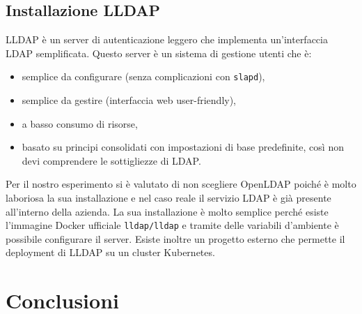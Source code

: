 \documentclass[12pt]{report}
\begin{document}
\section{Installazione LLDAP}
LLDAP è un server di autenticazione leggero che implementa un'interfaccia LDAP semplificata. Questo server è un sistema di gestione utenti che è:
\begin{itemize}
    \item semplice da configurare (senza complicazioni con \texttt{slapd}),
    \item semplice da gestire (interfaccia web user-friendly),
    \item a basso consumo di risorse,
    \item basato su principi consolidati con impostazioni di base predefinite, così non devi comprendere le sottigliezze di LDAP.
\end{itemize}
Per il nostro esperimento si è valutato di non scegliere OpenLDAP poiché è molto laboriosa la sua installazione e nel caso reale il servizio LDAP è già presente all'interno della azienda.
La sua installazione è molto semplice perché esiste l'immagine Docker ufficiale \texttt{lldap/lldap} e tramite delle variabili d'ambiente è possibile configurare il server.
Esiste inoltre un progetto esterno che permette il deployment di LLDAP su un cluster Kubernetes. 

\chapter{Conclusioni}
\end{document}
